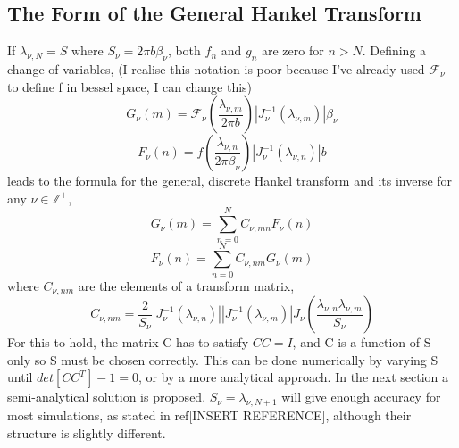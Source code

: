 \documentclass[10pt]{article}
\numberwithin{equation}{section}
\begin{document}
\begin{multicols}{2}
\subsection{The Form of the General Hankel Transform}

If $\lambda_{\nu,N}=S$ where $S_{\nu}=2\pi b\beta_{\nu}$, both $f_{n}$ and  $g_{n}$ are zero for $n> N$. Defining a change of variables, (I realise this notation is poor because I've already used $\mathcal{F}_{\nu}$ to define f in bessel space, I can change this)
\begin{equation}
G_{\nu}(m) = \mathcal{F}_{\nu}(\frac{\lambda_{\nu,m}}{2\pi b})|J_{\nu}^{-1}(\lambda_{\nu,m})|\beta_{\nu}
\end{equation}
\begin{equation}
F_{\nu}(n) = f(\frac{\lambda_{\nu,n}}{2\pi \beta_{\nu}})|J_{\nu}^{-1}(\lambda_{\nu,n})|b
\end{equation}
leads to the formula for the general, discrete Hankel transform and its inverse for any $\nu\in\mathbb{Z}^{+}$,
\begin{equation}
G_{\nu}(m) = \sum_{n=0}^{N}C_{\nu,mn}F_{\nu}(n)
\end{equation}
\begin{equation}
F_{\nu}(n) =  \sum_{n=0}^{N}C_{\nu,nm}G_{\nu}(m)
\end{equation}
where $C_{\nu,nm}$ are the elements of a transform matrix, 
\begin{equation}
C_{\nu,nm} = \frac{2}{S_\nu}|J_{\nu}^{-1}(\lambda_{\nu,n})||J_{\nu}^{-1}(\lambda_{\nu,m})|J_{\nu}(\frac{\lambda_{\nu,n}\lambda_{\nu,m}}{S_\nu})
\end{equation}
For this to hold, the matrix C has to satisfy $CC =I$, and C is a function of S only so S must be chosen correctly. This can be done numerically by varying S until $det[CC^{T}]-1=0$, or by a more analytical approach. In the next section a semi-analytical solution is proposed. $S_{\nu}=\lambda_{\nu,N+1}$  will give enough accuracy for most simulations, as stated in ref[INSERT REFERENCE], although their structure is slightly different.

\end{multicols}
\end{document}
